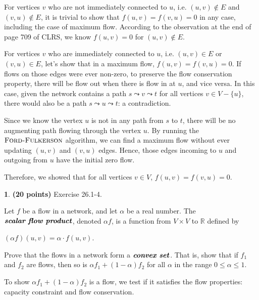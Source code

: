 \documentclass[11pt]{article}
\theoremstyle{definition}
\theoremstyle{theorem}
\newtheorem{prob}{}
\newcommand{\solution}{\medskip\noindent{\color{DarkBlue}\textbf{Solution:}}}
\begin{document}
\solution

For vertices $v$ who are not immediately connected to $u$, i.e. $(u, v) \not\in E$ and $(v, u) \not\in E$, it is trivial to show that $f(u, v) = f(v, u) = 0$ in any case, including the case of maximum flow. According to the observation at the end of page 709 of CLRS, we know $f(u, v) = 0$ for $(u, v) \not\in E$.

For vertices $v$ who are immediately connected to $u$, i.e. $(u, v) \in E$ or $(v, u) \in E$, let's show that in a maximum flow, $f(u, v) = f(v, u) = 0$. If flows on those edges were ever non-zero, to preserve the flow conservation property, there will be flow out when there is flow in at $u$, and vice versa. In this case, given the network contains a path $s \leadsto v \leadsto t$ for all vertices $v \in V - \{u\}$, there would also be a path $s \leadsto u \leadsto t$: a contradiction. 

Since we know the vertex $u$ is not in any path from $s$ to $t$, there will be no augmenting path flowing through the vertex $u$. By running the $\textproc{\textsc{Ford-Fulkerson}}$ algorithm, we can find a maximum flow without ever updating $(u, v)$ and $(v, u)$ edges. Hence, those edges incoming to $u$ and outgoing from $u$ have the initial zero flow.

Therefore, we showed that for all vertices $v \in V$, $f(u, v) = f(v, u) = 0$.


\newpage
\begin{prob} \textbf{(20 points)} Exercise 26.1-4.
\end{prob}

Let $f$ be a flow in a network, and let $\alpha$ be a real number. The $\textbf{\textit{scalar flow product}}$, denoted $\alpha f$, is a function from $V \times V$ to $\mathbb{R}$ defined by

$(\alpha f)(u, v) = \alpha \cdot f(u, v)$.

Prove that the flows in a network form a $\textbf{\textit{convex set}}$. That is, show that if $f_1$ and $f_2$ are flows, then so is $\alpha f_1 + (1 - \alpha) f_2$ for all $\alpha$ in the range $0 \le \alpha \le 1$.

\solution

To show $\alpha f_1 + (1 - \alpha) f_2$ is a flow, we test if it satisfies the flow properties: capacity constraint and flow conservation.
\end{document}
